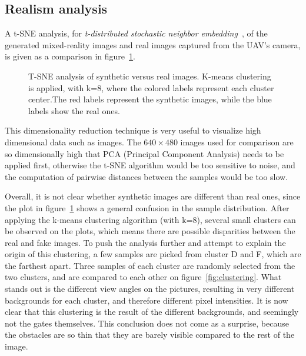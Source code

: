 \clearpage
\subsection{Realism analysis} \label{section-realism}

A t-SNE analysis, for \emph{t-distributed stochastic neighbor
embedding}~\cite{TSNE}, of the generated mixed-reality images and real images
captured from the UAV's camera, is given as a comparison in
figure~\ref{fig:tsne}.

\begin{figure}[h!]
   \centering
   \scalebox{0.75}{
      
   }
   \caption[T-SNE analysis of synthetic versus real images.]{T-SNE analysis of
      synthetic versus real images. K-means clustering is applied, with k=8,
      where the colored labels represent each cluster center.The red labels
   represent the synthetic images, while the blue labels show the real ones.}
   \label{fig:tsne}
\end{figure}

This dimensionality reduction technique is very useful to visualize high
dimensional data such as images. The $640 \times 480$ images used for
comparison are so dimensionally high that PCA (Principal Component Analysis)
needs to be applied first, otherwise the t-SNE algorithm would be too sensitive
to noise, and the computation of pairwise distances between the samples would
be too slow.

Overall, it is not clear whether synthetic images are different than real ones,
since the plot in figure~\ref{fig:tsne} shows a general confusion in the
sample distribution. After applying the k-means clustering algorithm (with
k=8), several small clusters can be observed on the plots, which means there
are possible disparities between the real and fake images. To push the analysis
further and attempt to explain the origin of this clustering, a few samples are
picked from cluster D and F, which are the farthest apart. Three samples of each
cluster are randomly selected from the two clusters, and are compared to each
other on figure~\ref{fig:clustering}. What stands out is the different view
angles on the pictures, resulting in very different backgrounds for each
cluster, and therefore different pixel intensities. It is now clear that this
clustering is the result of the different backgrounds, and seemingly not the
gates themselves. This conclusion does not come as a surprise, because the
obstacles are so thin that they are barely visible compared to the rest of the
image.

